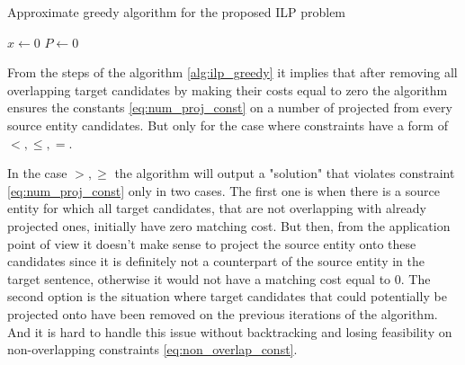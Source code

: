 \begin{algorithm}
    \caption{Approximate greedy algorithm for the proposed ILP problem} \label{alg:ilp_greedy}

    \( x \gets 0 \) \;
    \( P \gets 0 \) 
\end{algorithm}

From the steps of the algorithm \ref{alg:ilp_greedy} it implies that after removing all
overlapping target candidates by making their costs equal to zero the algorithm ensures the
constants \eqref{eq:num_proj_const} on a number of projected from every source entity candidates.
But only for the case where constraints have a form of \( <, \leq, = \).

In the case \( >, \geq \) the algorithm will output a "solution" that violates constraint
\eqref{eq:num_proj_const} only in two cases. The first one is when there is a source entity for which
all target candidates, that are not overlapping with already projected ones, initially have zero matching cost. But then,
from the application point of view it doesn't make sense to project the source entity onto these candidates
since it is definitely not a counterpart of the source entity in the target sentence, otherwise it would not
have a matching cost equal to \( 0 \). The second option is the situation where target candidates
that could potentially be projected onto have been removed on the previous iterations of the algorithm.
And it is hard to handle this issue without backtracking and losing feasibility on
non-overlapping constraints \eqref{eq:non_overlap_const}.

